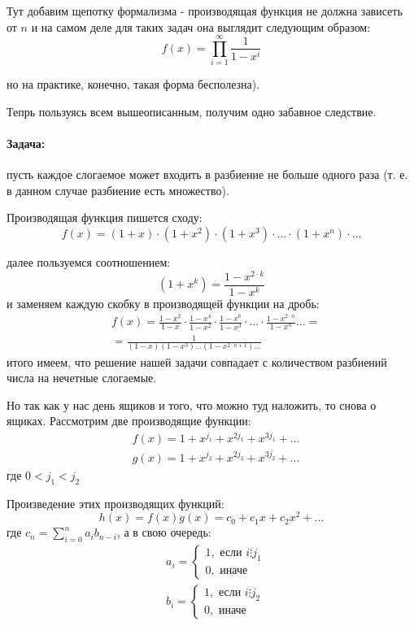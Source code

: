 Тут добавим щепотку формализма - производящая функция не должна зависеть от $n$ и на самом деле для таких задач она выглядит следующим образом:
\[
	f\left(x\right) = \prod_{i=1}^{\infty} \frac{1}{1 - x^i}
\]

но на практике, конечно, такая форма бесполезна).

Тепрь пользуясь всем вышеописанным, получим одно забавное следствие.

\paragraph{Задача:} пусть каждое слогаемое может входить в разбиение не больше одного раза (т. е. в данном случае разбиение есть множество).

Производящая функция пишется сходу:
\[
	f\left(x\right)=\left(1+x\right)\cdot\left(1+x^2\right)\cdot\left(1+x^3\right)\cdot...\cdot\left(1+x^n\right)\cdot...
\]

далее пользуемся соотношением:
\[
	\left(1+x^k\right) = \frac{1-x^{2\cdot k}}{1 - x^k}
\]
и заменяем каждую скобку в производящей функции на дробь:
\[
	\begin{split}
		&f\left(x\right) = \frac{1-x^2}{1-x}\cdot\frac{1-x^4}{1-x^2}\cdot\frac{1-x^6}{1-x^3}\cdot...\cdot\frac{1-x^{2\cdot n}}{1 - x^n}... = \\
		& = \frac{1}{\left(1-x\right)\left(1-x^3\right)...\left(1-x^{2\cdot n+1}\right)...}
	\end{split}
\]
итого имеем, что решение нашей задачи совпадает с количеством разбиений числа на нечетные слогаемые.

Но так как у нас день ящиков и того, что можно туд наложить, то снова о ящиках. Рассмотрим две производящие функции:
\[
	\begin{split}
		& f\left(x\right) = 1+x^{j_1}+x^{2j_1}+x^{3j_1}+...\\
		& g\left(x\right) = 1+x^{j_2}+x^{2j_2}+x^{3j_2}+...
	\end{split}
\]
где $0 < j_1 < j_2$

Произведение этих производящих функций:
\[
	h\left(x\right) = f\left(x\right)g\left(x\right) = c_0 + c_1x + c_2x^2 + ...
\]
где $c_n = \sum_{i=0}^n a_ib_{n-i}$, а в свою очередь:
\[
	\begin{split}
		& a_i = \begin{cases}1, \text{ если } i \vdots j_1 \\ 0, \text{ иначе }\end{cases} \\
		& b_i = \begin{cases}1, \text{ если } i \vdots j_2 \\ 0, \text{ иначе }\end{cases}
	\end{split}
\]

